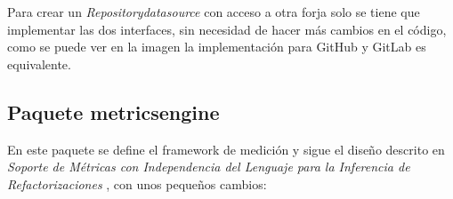 
Para crear un \textit{Repositorydatasource} con acceso a otra forja solo se tiene que implementar las dos interfaces, sin necesidad de hacer más cambios en el código, como se puede ver en la imagen la implementación para GitHub y GitLab es equivalente.

\subsection{Paquete metricsengine}
En este paquete se define el framework de medición y sigue el diseño descrito en \textit{Soporte de Métricas con Independencia del Lenguaje para la Inferencia de Refactorizaciones} \cite{marticorena_sanchez_soporte_2005}, con unos pequeños cambios:

